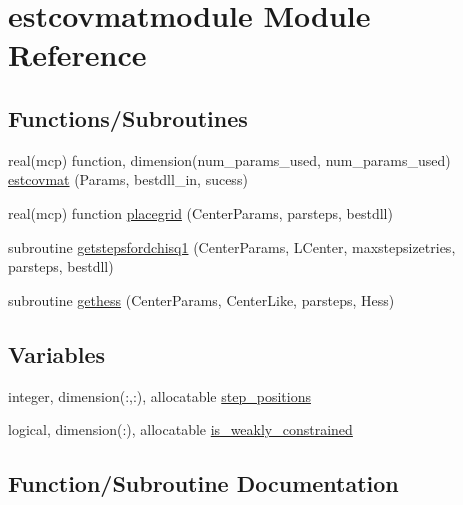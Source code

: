 \hypertarget{namespaceestcovmatmodule}{}\section{estcovmatmodule Module Reference}
\label{namespaceestcovmatmodule}
\subsection*{Functions/\+Subroutines}
\begin{DoxyCompactItemize}
\item 
real(mcp) function, dimension(num\+\_\+params\+\_\+used, num\+\_\+params\+\_\+used) \mbox{\hyperlink{namespaceestcovmatmodule_afcc46985583aeb4fed0524e52dde8c8a}{estcovmat}} (Params, bestdll\+\_\+in, sucess)
\item 
real(mcp) function \mbox{\hyperlink{namespaceestcovmatmodule_a2bc770f26c02a798aaf3ff8f2cc274aa}{placegrid}} (Center\+Params, parsteps, bestdll)
\item 
subroutine \mbox{\hyperlink{namespaceestcovmatmodule_ac80cbfe7c3c7ed84526e57a069e41ccf}{getstepsfordchisq1}} (Center\+Params, L\+Center, maxstepsizetries, parsteps, bestdll)
\item 
subroutine \mbox{\hyperlink{namespaceestcovmatmodule_a24745156f0a9a14a853ca7db8796afdc}{gethess}} (Center\+Params, Center\+Like, parsteps, Hess)
\end{DoxyCompactItemize}
\subsection*{Variables}
\begin{DoxyCompactItemize}
\item 
integer, dimension(\+:,\+:), allocatable \mbox{\hyperlink{namespaceestcovmatmodule_a5e47ee3f7267aa3efec263340a8244fc}{step\+\_\+positions}}
\item 
logical, dimension(\+:), allocatable \mbox{\hyperlink{namespaceestcovmatmodule_aae3649733742664790e565faa9dad010}{is\+\_\+weakly\+\_\+constrained}}
\end{DoxyCompactItemize}


\subsection{Function/\+Subroutine Documentation}
\mbox{\label{namespaceestcovmatmodule_afcc46985583aeb4fed0524e52dde8c8a}} 
